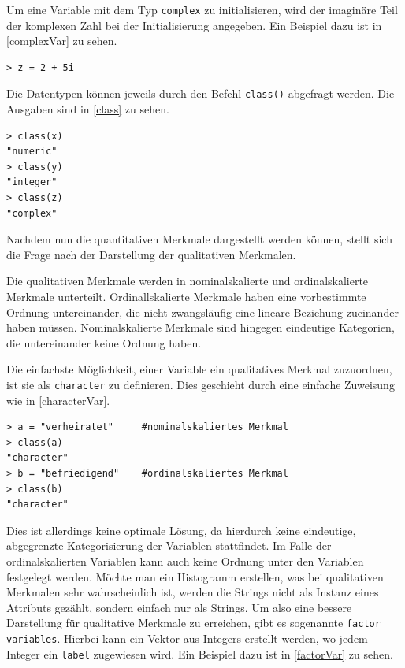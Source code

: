 \documentclass[a4paper, 12pt]{report} %
\begin{document}
Um eine Variable mit dem Typ \texttt{complex} zu initialisieren, wird der imaginäre Teil der komplexen Zahl bei der Initialisierung angegeben. Ein Beispiel dazu ist in \ref{complexVar} zu sehen.

\lstset{language=R}
\begin{lstlisting}[frame=single,caption={Deklarierung einer komplexen Variable z}]
> z = 2 + 5i
\end{lstlisting}
\label{complexVar}

Die Datentypen können jeweils durch den Befehl \texttt{class()} abgefragt werden. Die Ausgaben sind in \ref{class} zu sehen. 

\lstset{language=R}
\begin{lstlisting}[frame=single,caption={Abfrage des Datentypen}]
> class(x)
"numeric"
> class(y)
"integer"
> class(z)
"complex"
\end{lstlisting}
\label{class}

Nachdem nun die quantitativen Merkmale dargestellt werden können, stellt sich die Frage nach der Darstellung der qualitativen Merkmalen. 

Die qualitativen Merkmale werden in nominalskalierte und ordinalskalierte Merkmale unterteilt. Ordinallskalierte Merkmale haben eine vorbestimmte Ordnung untereinander, die nicht zwangsläufig eine lineare Beziehung zueinander haben müssen. Nominalskalierte Merkmale sind hingegen eindeutige Kategorien, die untereinander keine Ordnung haben. 

Die einfachste Möglichkeit, einer Variable ein qualitatives Merkmal zuzuordnen, ist sie als \texttt{character} zu definieren. Dies geschieht durch eine einfache Zuweisung wie in \ref{characterVar}.

\lstset{language=R}
\begin{lstlisting}[frame=single,caption={Deklarierung einer qualitativen Variable a}]
> a = "verheiratet"     #nominalskaliertes Merkmal
> class(a)
"character"
> b = "befriedigend"	#ordinalskaliertes Merkmal
> class(b)
"character"
\end{lstlisting}
\label{characterVar}

Dies ist allerdings keine optimale Lösung, da hierdurch keine eindeutige, abgegrenzte Kategorisierung der Variablen stattfindet. Im Falle der ordinalskalierten Variablen kann auch keine Ordnung unter den Variablen festgelegt werden. Möchte man ein Histogramm erstellen, was bei qualitativen Merkmalen sehr wahrscheinlich ist, werden die Strings nicht als Instanz eines Attributs gezählt, sondern einfach nur als Strings. Um also eine bessere Darstellung für qualitative Merkmale zu erreichen, gibt es sogenannte \texttt{factor variables}. Hierbei kann ein Vektor aus Integers erstellt werden, wo jedem Integer ein \texttt{label} zugewiesen wird. Ein Beispiel dazu ist in \ref{factorVar} zu sehen. 
\end{document}
